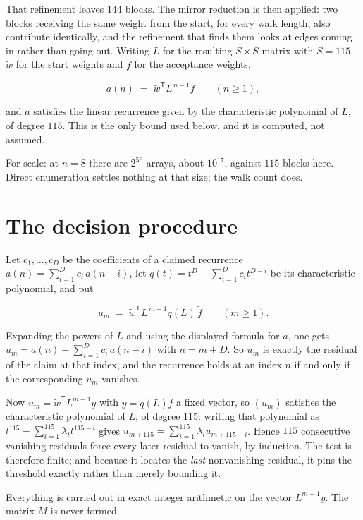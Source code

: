\documentclass[11pt]{article}
\theoremstyle{definition}
\begin{document}
That refinement leaves $144$ blocks. The mirror reduction is then applied: two blocks receiving the same weight from the start, for every walk length, also contribute identically, and the refinement that finds them looks at edges coming in rather than going out. Writing $L$ for the resulting $S \times S$ matrix with $S = 115$, $\tilde w$ for the start weights and $\tilde f$ for the acceptance weights,

\[a(n) \;=\; \tilde w^{\mathsf T} L^{\,n-1} \tilde f \qquad (n \ge 1),\]

and $a$ satisfies the linear recurrence given by the characteristic polynomial of $L$, of degree $115$. This is the only bound used below, and it is computed, not assumed.

For scale: at $n = 8$ there are $2^{56}$ arrays, about $10^{17}$, against $115$ blocks here. Direct enumeration settles nothing at that size; the walk count does.

\section{The decision procedure}

Let $c_1,\dots,c_D$ be the coefficients of a claimed recurrence $a(n) = \sum_{i=1}^{D} c_i\,a(n-i)$, let $q(t) = t^{D} - \sum_{i=1}^{D} c_i t^{D-i}$ be its characteristic polynomial, and put

\[u_m \;=\; \tilde w^{\mathsf T} L^{\,m-1} q(L)\,\tilde f \qquad (m \ge 1).\]

Expanding the powers of $L$ and using the displayed formula for $a$, one gets $u_m = a(n) - \sum_{i=1}^{D} c_i\,a(n-i)$ with $n = m + D$. So $u_m$ is exactly the residual of the claim at that index, and the recurrence holds at an index $n$ if and only if the corresponding $u_m$ vanishes.

Now $u_m = \tilde w^{\mathsf T} L^{m-1} y$ with $y = q(L)\tilde f$ a fixed vector, so $(u_m)$ satisfies the characteristic polynomial of $L$, of degree $115$: writing that polynomial as $t^{115} - \sum_{i=1}^{115} \lambda_i t^{115-i}$ gives $u_{m+115} = \sum_{i=1}^{115} \lambda_i u_{m+115-i}$. Hence $115$ consecutive vanishing residuals force every later residual to vanish, by induction. The test is therefore finite; and because it locates the {\itshape last} nonvanishing residual, it pins the threshold exactly rather than merely bounding it.

Everything is carried out in exact integer arithmetic on the vector $L^{m-1}y$. The matrix $M$ is never formed.
\end{document}
